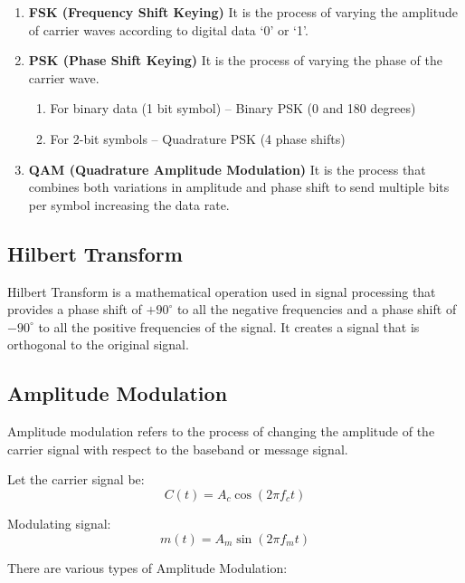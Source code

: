 \begin{enumerate}[label=\textbf{\arabic*.}, itemsep=6pt, parsep=12pt, leftmargin=*]
\begin{enumerate}[
            label=\textbf{\alph*.},
            itemsep=6pt,
            parsep=6pt,
            leftmargin=*
        ]
        \item \textbf{FSK (Frequency Shift Keying)}  
        It is the process of varying the amplitude of carrier waves according to digital data `0' or `1'.

        \item \textbf{PSK (Phase Shift Keying)}  
        It is the process of varying the phase of the carrier wave.
        \begin{enumerate}[label=\roman*., itemsep=0pt, parsep=0pt]
            \item For binary data (1 bit symbol) -- Binary PSK (0 and 180 degrees)
            \item For 2-bit symbols -- Quadrature PSK (4 phase shifts)
        \end{enumerate}

        \item \textbf{QAM (Quadrature Amplitude Modulation)}  
        It is the process that combines both variations in amplitude and phase shift to send multiple bits per symbol increasing the data rate.
    \end{enumerate}
\end{enumerate}

\subsection*{Hilbert Transform}

Hilbert Transform is a mathematical operation used in signal processing that provides a phase shift of $+90^\circ$ to all the negative frequencies and a phase shift of $-90^\circ$ to all the positive frequencies of the signal. It creates a signal that is orthogonal to the original signal.

\subsection*{Amplitude Modulation}

Amplitude modulation refers to the process of changing the amplitude of the carrier signal with respect to the baseband or message signal.

Let the carrier signal be: \[
C(t) = A_c \cos(2\pi f_c t)
\]

Modulating signal: \[
m(t) = A_m \sin(2\pi f_m t)
\]

There are various types of Amplitude Modulation:

